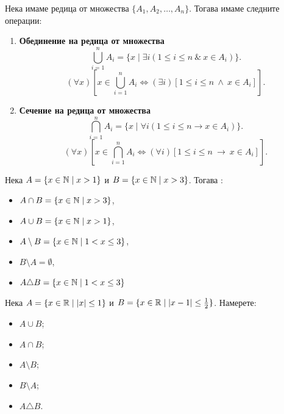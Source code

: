   Нека имаме редица от множества $\{A_1,A_2,\dots,A_n\}$.
  Тогава имаме следните операции:
  \begin{enumerate}[{\bf (I)}]
  \item
    {\bf Обединение на редица от множества}
    \[\bigcup^{n}_{i=1} A_i = \{x \mid \exists i (1\leq i\leq n\ \&\ x\in A_i)\}.\]
    \[(\forall x)[x \in \bigcup^n_{i=1}A_i \iff (\exists i)[1 \leq i \leq n\ \wedge\ x \in A_i]].\]
  \item
    {\bf Сечение на редица от множества}
    \[\bigcap^{n}_{i=1} A_i = \{x \mid \forall i (1\leq i\leq n \rightarrow x\in A_i)\}.\]
    \[(\forall x)[x \in \bigcap^n_{i=1}A_i \iff (\forall i)[1 \leq i \leq n\ \rightarrow\ x \in A_i]].\]
  \end{enumerate}

\begin{example}
  Нека $A = \{x\in\mathbb{N}\mid x > 1\}$ и $B = \{x\in\mathbb{N}\mid x>3\}$. Тогава :
  \begin{itemize}
    \item
      $A\cap B = \{x\in\mathbb{N}\mid x > 3\}$,
    \item
      $A\cup B = \{x\in\mathbb{N}\mid x > 1\}$,
    \item
      $A\setminus B = \{x\in\mathbb{N}\mid 1<x\leq 3\}$,
    \item
      $B\setminus A = \emptyset$,
    \item
      $A\triangle B = \{x\in\mathbb{N}\mid 1<x\leq 3\}$
    \end{itemize}
\end{example}


\begin{problem}
  Нека $A = \{x\in\mathbb{R}\mid |x|\leq 1\}$ и $B = \{x\in\mathbb{R}\mid |x-1|\leq \frac{1}{2}\}$.
  Намерете:
  \begin{itemize}
  \item 
    $A\cup B$;
  \item
    $A\cap B$;
  \item
    $A\setminus B$;
  \item
    $B\setminus A$;
  \item
    $A \triangle B$.
  \end{itemize}
\end{problem}


